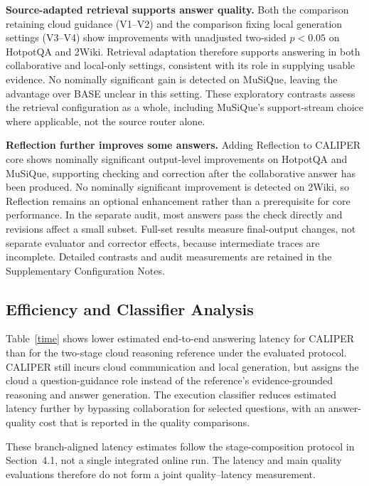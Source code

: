 \documentclass[a4paper,fleqn]{cas-dc}
\begin{document}
\textbf{Source-adapted retrieval supports answer quality.} Both the comparison retaining cloud guidance (V1--V2) and the comparison fixing local generation settings (V3--V4) show improvements with unadjusted two-sided $p<0.05$ on HotpotQA and 2Wiki. Retrieval adaptation therefore supports answering in both collaborative and local-only settings, consistent with its role in supplying usable evidence. No nominally significant gain is detected on MuSiQue, leaving the advantage over BASE unclear in this setting. These exploratory contrasts assess the retrieval configuration as a whole, including MuSiQue's support-stream choice where applicable, not the source router alone.

\textbf{Reflection further improves some answers.} Adding Reflection to CALIPER core shows nominally significant output-level improvements on HotpotQA and MuSiQue, supporting checking and correction after the collaborative answer has been produced. No nominally significant improvement is detected on 2Wiki, so Reflection remains an optional enhancement rather than a prerequisite for core performance. In the separate audit, most answers pass the check directly and revisions affect a small subset. Full-set results measure final-output changes, not separate evaluator and corrector effects, because intermediate traces are incomplete. Detailed contrasts and audit measurements are retained in the Supplementary Configuration Notes.

\subsection{Efficiency and Classifier Analysis}\label{efficiency_analysis}
Table~\ref{time} shows lower estimated end-to-end answering latency for CALIPER than for the two-stage cloud reasoning reference under the evaluated protocol. CALIPER still incurs cloud communication and local generation, but assigns the cloud a question-guidance role instead of the reference's evidence-grounded reasoning and answer generation. The execution classifier reduces estimated latency further by bypassing collaboration for selected questions, with an answer-quality cost that is reported in the quality comparisons.

These branch-aligned latency estimates follow the stage-composition protocol in Section~4.1, not a single integrated online run. The latency and main quality evaluations therefore do not form a joint quality--latency measurement.
\end{document}
